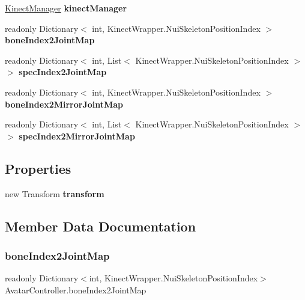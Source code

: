\begin{DoxyCompactItemize}
\item 
\mbox{\label{class_avatar_controller_a184d57b6eb71497ed7a12ed30eb52bae}} 
\mbox{\hyperlink{class_kinect_manager}{Kinect\+Manager}} {\bfseries kinect\+Manager}
\item 
readonly Dictionary$<$ int, Kinect\+Wrapper.\+Nui\+Skeleton\+Position\+Index $>$ {\bfseries bone\+Index2\+Joint\+Map}
\item 
readonly Dictionary$<$ int, List$<$ Kinect\+Wrapper.\+Nui\+Skeleton\+Position\+Index $>$ $>$ {\bfseries spec\+Index2\+Joint\+Map}
\item 
readonly Dictionary$<$ int, Kinect\+Wrapper.\+Nui\+Skeleton\+Position\+Index $>$ {\bfseries bone\+Index2\+Mirror\+Joint\+Map}
\item 
readonly Dictionary$<$ int, List$<$ Kinect\+Wrapper.\+Nui\+Skeleton\+Position\+Index $>$ $>$ {\bfseries spec\+Index2\+Mirror\+Joint\+Map}
\end{DoxyCompactItemize}
\subsection*{Properties}
\begin{DoxyCompactItemize}
\item 
\mbox{\label{class_avatar_controller_a38a4ef1c0030484ba18dd905f850aa7a}} 
new Transform {\bfseries transform}
\end{DoxyCompactItemize}


\subsection{Member Data Documentation}
\mbox{\label{class_avatar_controller_af44970b84262aacd3c76c192095fedd7}} 
\subsubsection{\texorpdfstring{bone\+Index2\+Joint\+Map}{boneIndex2JointMap}}
{\footnotesize\ttfamily readonly Dictionary$<$int, Kinect\+Wrapper.\+Nui\+Skeleton\+Position\+Index$>$ Avatar\+Controller.\+bone\+Index2\+Joint\+Map\hspace{0.3cm}{\ttfamily [protected]}}

